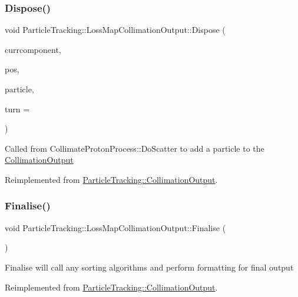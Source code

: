 \subsubsection{\texorpdfstring{Dispose()}{Dispose()}}
{\footnotesize\ttfamily void Particle\+Tracking\+::\+Loss\+Map\+Collimation\+Output\+::\+Dispose (\begin{DoxyParamCaption}\item[{\hyperlink{classAcceleratorComponent}{Accelerator\+Component} \&}]{currcomponent,  }\item[{double}]{pos,  }\item[{\hyperlink{classPSvector}{Particle} \&}]{particle,  }\item[{int}]{turn = {} }\end{DoxyParamCaption})\hspace{0.3cm}{\ttfamily [virtual]}}

Called from Collimate\+Proton\+Process\+::\+Do\+Scatter to add a particle to the \hyperlink{classParticleTracking_1_1CollimationOutput}{Collimation\+Output} 

Reimplemented from \hyperlink{classParticleTracking_1_1CollimationOutput}{Particle\+Tracking\+::\+Collimation\+Output}.

\mbox{\label{classParticleTracking_1_1LossMapCollimationOutput_a74a6bede8d155ab85825132d4b4e5b62}} 
\subsubsection{\texorpdfstring{Finalise()}{Finalise()}}
{\footnotesize\ttfamily void Particle\+Tracking\+::\+Loss\+Map\+Collimation\+Output\+::\+Finalise (\begin{DoxyParamCaption}{ }\end{DoxyParamCaption})\hspace{0.3cm}{\ttfamily [virtual]}}

Finalise will call any sorting algorithms and perform formatting for final output 

Reimplemented from \hyperlink{classParticleTracking_1_1CollimationOutput}{Particle\+Tracking\+::\+Collimation\+Output}.

